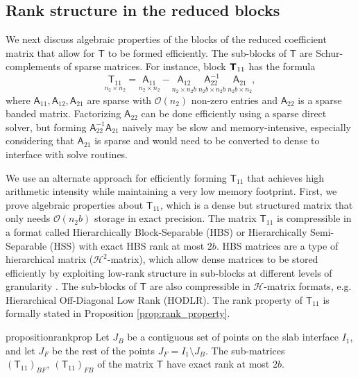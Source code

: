 \documentclass[10pt,a4paper]{amsart}
\newcommand{\mtx}[1]{\bm{\mathsf{#1}}}
\begin{document}
\subsection{Rank structure in the reduced blocks}
\label{sec:rank_reduced}

We next discuss algebraic properties of the blocks of the reduced coefficient matrix that allow for $\mtx T$ to be formed efficiently. The sub-blocks of $\mtx T$ are Schur-complements of sparse matrices. For instance, block $\mtx T_{\rm 11}$
has the formula
\begin{equation}\underset{n_2 \times n_2}{\mtx T_{11}} = \underset{n_2 \times n_2}{\mtx A_{11}} - \underset{n_2 \times n_2 b} {\mtx A_{12}}\ 
\underset{n_2 b \times n_2 b} {\mtx A_{22}^{-1}}\ \underset{n_2 b \times n_2} {\mtx A_{21}},
\label{eq:T11_detailed}
\end{equation}
where $\mtx A_{11}, \mtx A_{12}, \mtx A_{21}$ are sparse with $\mathcal O(n_2)$ non-zero entries and $\mtx A_{22}$ is a sparse banded matrix. 
Factorizing $\mtx A_{22}$ can be done efficiently using a sparse direct solver, 
but forming $\mtx A_{22}^{-1} \mtx A_{21}$ naively may be slow and memory-intensive, especially considering that 
$\mtx A_{21}$ is sparse and would need to be converted to dense to interface with solve routines. 

We use an alternate approach for efficiently forming $\mtx T_{11}$ that achieves high arithmetic intensity
while maintaining a very low memory footprint. First, we prove algebraic properties about $\mtx T_{11}$, which is a
dense but structured matrix that only needs $\mathcal O(n_2 b)$ storage 
in exact precision. 
The matrix $\mtx T_{11}$ is compressible in a format called Hierarchically Block-Separable (HBS) or Hierarchically
Semi-Separable (HSS) with exact HBS rank at most $2b$. 
HBS matrices are a type of hierarchical matrix ($\mathcal H^2$-matrix), which allow dense matrices to be stored efficiently
by exploiting low-rank structure in sub-blocks at different levels of granularity \cite{2008_bebendorf_book,hackbusch2015hierarchical,2019_martinsson_book}.
The sub-blocks of $\mtx T$ are also compressible in $\mathcal H$-matrix formats, e.g. Hierarchical Off-Diagonal Low Rank (HODLR). 
The rank property of $\mtx T_{11}$ is formally stated in Proposition \ref{prop:rank_property}.

\begin{restatable}{proposition}{rankprop}
\label{prop:rank_property}
Let $J_B$ be a contiguous set of points on the slab interface $I_1$, and 
let $J_F$ be the rest of the points $J_{F} = I_1 \setminus J_{B}$.
The sub-matrices
$(\mtx T_{11})_{BF},\ (\mtx T_{11})_{FB}$ of the matrix $\mtx T$ have exact rank at most $2b$. 
\end{restatable}
\end{document}
